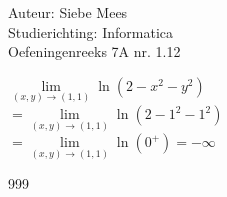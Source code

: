 \documentclass[a4paper]{article}
\begin{document}
  
\noindent \large Auteur: Siebe Mees \\
\noindent \large Studierichting: Informatica\\
\noindent \large Oefeningenreeks 7A nr. 1.12\\

\medskip

\normalsize

$ \lim\limits_{(x,y)\rightarrow(1,1)} \ln(2-x^2-y^2) $\\

$ = \lim\limits_{(x,y)\rightarrow(1,1)} \ln(2-1^2-1^2) $\\

$ = \lim\limits_{(x,y)\rightarrow(1,1)} \ln(0^+) = -\infty $\\

\begin{thebibliography}{999}
\end{thebibliography}
\end{document}
